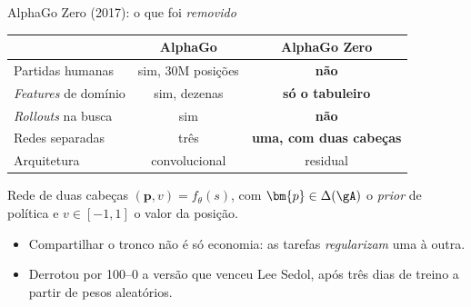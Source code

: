 \documentclass[aspectratio=169, 11pt]{beamer}
\begin{document}
\begin{frame}{AlphaGo Zero (2017): o que foi \emph{removido}}
  \centering
  {\small
  \begin{tabular}{@{}lcc@{}}
    \toprule
    & \textbf{AlphaGo} & \textbf{AlphaGo Zero} \\
    \midrule
    Partidas humanas          & sim, 30M posições & \color{rlVerde!70!black}\bfseries não \\
    \emph{Features} de domínio & sim, dezenas     & \color{rlVerde!70!black}\bfseries só o tabuleiro \\
    \emph{Rollouts} na busca   & sim              & \color{rlVerde!70!black}\bfseries não \\
    Redes separadas            & três             & \color{rlVerde!70!black}\bfseries uma, com duas cabeças \\
    Arquitetura                & convolucional    & residual \\
    \bottomrule
  \end{tabular}}

  \vspace{0.2em}
  \raggedright
  \begin{defbox}{Rede de duas cabeças}
    $(\bm{p}, v) = f_\theta(s)$, com $\bm{p} \in \Delta(\gA)$ o \emph{prior} de
    política e $v \in [-1,1]$ o valor da posição.
  \end{defbox}

  \vspace{-0.3em}
  \begin{itemize}\setlength{\itemsep}{0.2ex}
    \item Compartilhar o tronco não é só economia: as tarefas \emph{regularizam}
          uma à outra.
    \item Derrotou por 100--0 a versão que venceu Lee Sedol, após três dias de
          treino a partir de pesos aleatórios.
  \end{itemize}
\end{frame}
\end{document}

